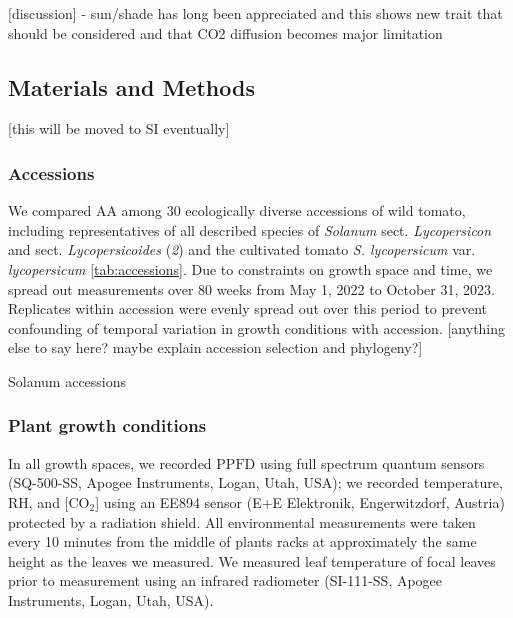 \documentclass[
  letterpaper,
  DIV=11,
  numbers=noendperiod]{scrartcl}
\begin{document}
{[}discussion{]} - sun/shade has long been appreciated and this shows
new trait that should be considered and that CO2 diffusion becomes major
limitation

\subsection{Materials and Methods}\label{materials-and-methods}

{[}this will be moved to SI eventually{]}

\subsubsection{Accessions}\label{accessions}

We compared AA among 30 ecologically diverse accessions of wild tomato,
including representatives of all described species of \emph{Solanum}
sect. \emph{Lycopersicon} and sect. \emph{Lycopersicoides} (\emph{2})
and the cultivated tomato \emph{S. lycopersicum} var.
\emph{lycopersicum} \autoref{tab:accessions}. Due to constraints on
growth space and time, we spread out measurements over 80 weeks from May
1, 2022 to October 31, 2023. Replicates within accession were evenly
spread out over this period to prevent confounding of temporal variation
in growth conditions with accession. {[}anything else to say here? maybe
explain accession selection and phylogeny?{]}

\begin{table}

\caption{\label{tbl-accessions}Solanum accessions}

\centering{

}

\end{table}%

\subsubsection{Plant growth conditions}\label{plant-growth-conditions}

In all growth spaces, we recorded \(\mathrm{PPFD}\) using full spectrum
quantum sensors (SQ-500-SS, Apogee Instruments, Logan, Utah, USA); we
recorded temperature, RH, and {[}CO\(_2\){]} using an EE894 sensor (E+E
Elektronik, Engerwitzdorf, Austria) protected by a radiation shield. All
environmental measurements were taken every 10 minutes from the middle
of plants racks at approximately the same height as the leaves we
measured. We measured leaf temperature of focal leaves prior to
measurement using an infrared radiometer (SI-111-SS, Apogee Instruments,
Logan, Utah, USA).
\end{document}
